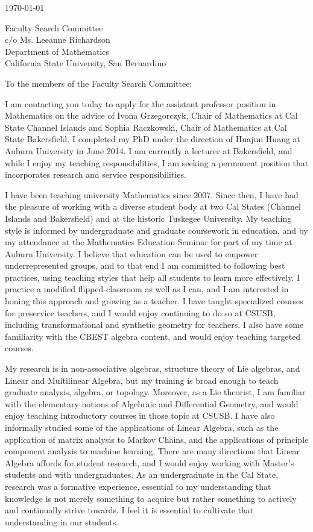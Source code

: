 \documentclass[11pt]{article}
\begin{document}
\makeletterhead

\vfill

\today

\vfill

Faculty Search Committee\\
c/o Ms. Leeanne Richardson\\
Department of Mathematics\\
California State University, San Bernardino

\vfill

To the members of the Faculty Search Committee:

\vfill

I am contacting you today to apply for the assistant professor position
in Mathematics on the advice of Ivona Grzegorczyk,
Chair of Mathematics at Cal State Channel Islands
and Sophia Raczkowski, Chair of Mathematics at Cal State Bakersfield.
I completed my PhD under the direction of Huajun Huang
at Auburn University in June 2014.
I am currently a lecturer at Bakersfield,
and while I enjoy my teaching responsibilities,
I am seeking a permanent position that incorporates
research and service responsibilities.

I have been teaching university Mathematics since 2007.
Since then, I have had the pleasure of working
with a diverse student body
at two Cal States (Channel Islands and Bakersfield)
and at the historic Tuskegee University.
My teaching style is informed by undergraduate and graduate coursework
in education, and by my attendance at the Mathematics Education Seminar
for part of my time at Auburn University.
I believe that education can be used to empower underrepresented groups,
and to that end I am committed to following best practices,
using teaching styles that help all students to learn more effectively.
I practice a modified flipped-classroom as well as I can,
and I am interested in honing this approach and growing as a teacher.
I have taught specialized courses for preservice teachers,
and I would enjoy continuing to do so at CSUSB,
including transformational and synthetic geometry for teachers.
I also have some familiarity with the CBEST algebra content,
and would enjoy teaching targeted courses.

My research is in non-associative algebras, structure theory of Lie
algebras, and Linear and Multilinear Algebra, but my training is
broad enough to teach graduate analysis, algebra, or topology.
Moreover, as a Lie theorist, I am familiar with the elementary notions
of Algebraic and Differential Geometry, and would enjoy teaching
introductory courses in those topic at CSUSB.
I have also informally studied some of the applications
of Linear Algebra,
such as the application of matrix analysis to Markov Chains,
and the applications of principle component analysis
to machine learning.
There are many directions that Linear Algebra affords for
student research, and I would enjoy working with Master's students
and with undergraduates.
As an undergraduate in the Cal State,
research was a formative experience,
essential to my understanding that knowledge
is not merely something to acquire
but rather something to actively and continually strive towards.
I feel it is essential to cultivate that understanding in our students.
\end{document}
